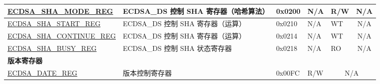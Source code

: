 \begin{longtable}{ | p{4.8cm} | l | p{1.3cm} | l | l | l | l | }
\hyperref[regdesc:ECDSASHAMODEREG]{ECDSA\_SHA\_MODE\_REG} & ECDSA\_DS 控制 SHA 寄存器（哈希算法） & 0x0200 & N/A & R/W & \multicolumn{2}{|c|}{N/A} \\ \hline
\hyperref[regdesc:ECDSASHASTARTREG]{ECDSA\_SHA\_START\_REG} & ECDSA\_DS 控制 SHA 寄存器（运算） & 0x0210 & N/A & WT & \multicolumn{2}{|c|}{N/A} \\ \hline
\hyperref[regdesc:ECDSASHACONTINUEREG]{ECDSA\_SHA\_CONTINUE\_REG} & ECDSA\_DS 控制 SHA 寄存器（运算） & 0x0214 & N/A & WT & \multicolumn{2}{|c|}{N/A} \\ \hline
\hyperref[regdesc:ECDSASHABUSYREG]{ECDSA\_SHA\_BUSY\_REG} & ECDSA\_DS 控制 SHA 状态寄存器 & 0x0218 & N/A & RO & \multicolumn{2}{|c|}{N/A} \\ \hline
\multicolumn{7}{|l|}{\textbf{版本寄存器}} \\ \hline
\hyperref[regdesc:ECDSADATEREG]{ECDSA\_DATE\_REG} & 版本控制寄存器 & 0x00FC & R/W & \multicolumn{3}{|c|}{N/A} \\ \hline
\end{longtable}